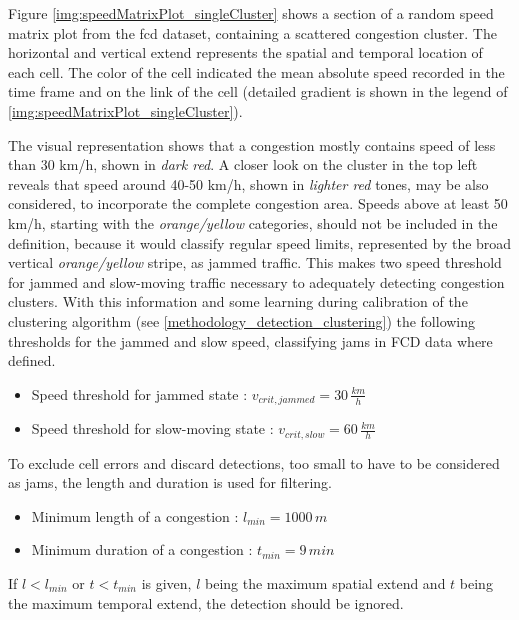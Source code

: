 Figure \ref{img:speedMatrixPlot_singleCluster} shows a section of a random speed matrix plot from the \acrshort{fcd} dataset, containing a scattered congestion cluster. The horizontal and vertical extend represents the spatial and temporal location of each cell. The color of the cell indicated the mean absolute speed recorded in the time frame and on the link of the cell (detailed gradient is shown in the legend of \cref{img:speedMatrixPlot_singleCluster}).

The visual representation shows that a congestion mostly contains speed of less than 30 km/h, shown in \textit{dark red}. A closer look on the cluster in the top left reveals that speed around 40-50 km/h, shown in \textit{lighter red} tones, may be also considered, to incorporate the complete congestion area. Speeds above at least 50 km/h, starting with the \textit{orange/yellow} categories, should not be included in the definition, because it would classify regular speed limits, represented by the broad vertical \textit{orange/yellow} stripe, as jammed traffic. This makes two speed threshold for jammed and slow-moving traffic necessary to adequately detecting congestion clusters. With this information and some learning during calibration of the clustering algorithm (see \cref{methodology_detection_clustering}) the following thresholds for the jammed and slow speed, classifying \glspl{jam} in FCD data where defined.

\begin{itemize}
	\item Speed threshold for jammed state : $v_{crit,jammed} = 30\,\frac{km}{h}$
	\item Speed threshold for slow-moving state : $v_{crit,slow} = 60\,\frac{km}{h}$
\end{itemize}

To exclude cell errors and discard detections, too small to have to be considered as jams, the length and duration is used for filtering. 

\begin{itemize}
	\item Minimum length of a congestion : $l_{min} = 1000\,m$
	\item Minimum duration of a congestion : $t_{min} = 9\,min$
\end{itemize}

If $l < l_{min}$ or $t < t_{min}$ is given, $l$ being the maximum spatial extend and $t$ being the maximum temporal extend, the detection should be ignored.
